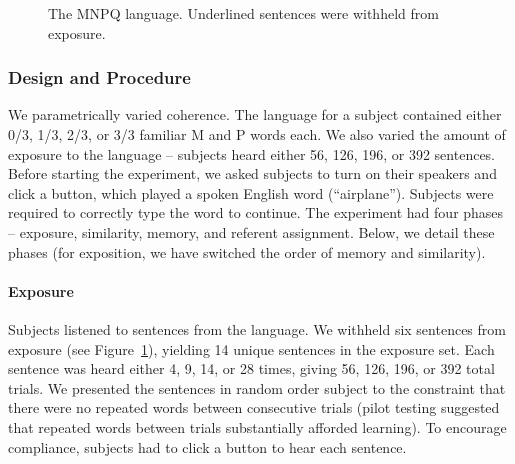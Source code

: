 \documentclass[man,floatsintext]{apa6}
\begin{document}
\begin{figure}[t]
  \begin{center}
  \vskip 0.12in
  \caption{The MNPQ language. Underlined sentences were withheld from exposure.}
  \label{mnpq-table}
  \end{center}
\end{figure}

\subsubsection{Design and Procedure}

We parametrically varied coherence. The language for a subject contained either 0/3, 1/3, 2/3, or 3/3 familiar M and P words each. We also varied the amount of exposure to the language -- subjects heard either 56, 126, 196, or 392 sentences. Before starting the experiment, we asked subjects to turn on their speakers and click a button, which played a spoken English word (``airplane''). Subjects were required to correctly type the word to continue. The experiment had four phases -- exposure, similarity, memory, and referent assignment. Below, we detail these phases (for exposition, we have switched the order of memory and similarity).

\paragraph{Exposure}
Subjects listened to sentences from the language. We withheld 
six sentences from exposure (see Figure~\ref{mnpq-table}), yielding 14 unique sentences in the exposure set. Each sentence was heard either 4, 9, 14, or 28 times, giving 56, 126, 196, or 392 total trials. We presented the sentences in random order subject to the constraint that there were no repeated words between consecutive trials (pilot testing suggested that repeated words between trials substantially afforded learning). To encourage compliance, subjects had to click a button to hear each sentence.
\end{document}
